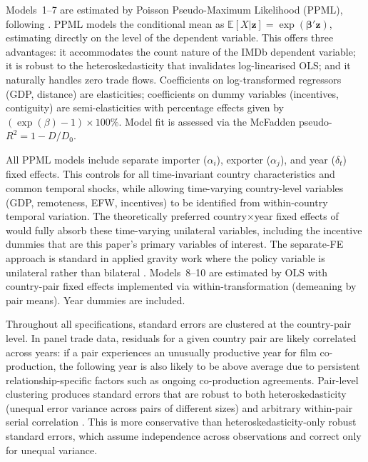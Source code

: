 Models~1--7 are estimated by Poisson Pseudo-Maximum Likelihood (PPML), following \citet{santos2006}. PPML models the conditional mean as $\mathbb{E}[X|\mathbf{z}] = \exp(\boldsymbol{\beta}'\mathbf{z})$, estimating directly on the level of the dependent variable. This offers three advantages: it accommodates the count nature of the IMDb dependent variable; it is robust to the heteroskedasticity that invalidates log-linearised OLS; and it naturally handles zero trade flows. Coefficients on log-transformed regressors (GDP, distance) are elasticities; coefficients on dummy variables (incentives, contiguity) are semi-elasticities with percentage effects given by $(\exp(\beta) - 1) \times 100\%$. Model fit is assessed via the McFadden pseudo-$R^2 = 1 - D/D_0$.

All PPML models include separate importer ($\alpha_i$), exporter ($\alpha_j$), and year ($\delta_t$) fixed effects. This controls for all time-invariant country characteristics and common temporal shocks, while allowing time-varying country-level variables (GDP, remoteness, EFW, incentives) to be identified from within-country temporal variation. The theoretically preferred country$\times$year fixed effects of \citet{baier2009} would fully absorb these time-varying unilateral variables, including the incentive dummies that are this paper's primary variables of interest. The separate-FE approach is standard in applied gravity work where the policy variable is unilateral rather than bilateral \citep[e.g.,][]{kimura2006}. Models~8--10 are estimated by OLS with country-pair fixed effects implemented via within-transformation (demeaning by pair means). Year dummies are included.

Throughout all specifications, standard errors are clustered at the country-pair level. In panel trade data, residuals for a given country pair are likely correlated across years: if a pair experiences an unusually productive year for film co-production, the following year is also likely to be above average due to persistent relationship-specific factors such as ongoing co-production agreements. Pair-level clustering produces standard errors that are robust to both heteroskedasticity (unequal error variance across pairs of different sizes) and arbitrary within-pair serial correlation \citep{bertrand2004, cameron2015}. This is more conservative than heteroskedasticity-only robust standard errors, which assume independence across observations and correct only for unequal variance.

